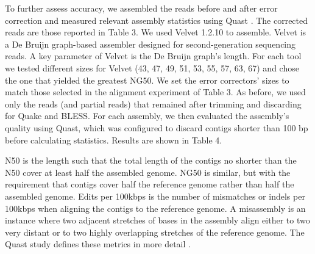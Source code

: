 \documentclass{bmcart}
\begin{document}




To further assess accuracy, we assembled the reads before and after error correction and measured relevant assembly statistics using Quast \cite{gurevich2013quast}.  The corrected reads are those reported in Table 3. We used Velvet 1.2.10 \cite{zerbino2008velvet} to assemble.  Velvet is a De Bruijn graph-based assembler designed for second-generation sequencing reads.  A key parameter of Velvet is the De Bruijn graph's \kmer length.  For each tool we tested different \kmer sizes for Velvet (43, 47, 49, 51, 53, 55, 57, 63, 67) and chose the one that yielded the greatest NG50.  We set the error correctors' \kmer sizes to match those selected in the alignment experiment of Table 3.  As before, we used only the reads (and partial reads) that remained after trimming and discarding for Quake and BLESS.  For each assembly, we then evaluated the assembly's quality using Quast, which was configured to discard contigs shorter than 100 bp before calculating statistics. Results are shown in Table 4.


N50 is the length such that the total length of the contigs no shorter than the N50 cover at least half the assembled genome.  NG50 is similar, but with the requirement that contigs cover half the reference genome rather than half the assembled genome. Edits per 100kbps is the number of mismatches or indels per 100kbps when aligning the contigs to the reference genome. A misassembly is an instance where two adjacent stretches of bases in the assembly align either to two very distant or to two highly overlapping stretches of the reference genome.  The Quast study defines these metrics in more detail \cite{gurevich2013quast}.
\end{document}
